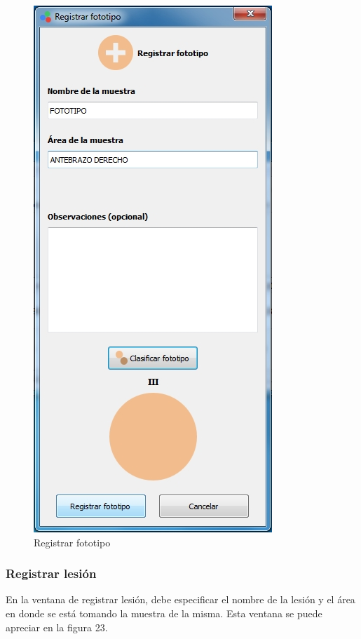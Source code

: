\begin{figure}[H]
  \centering
  \includegraphics[width=.5\linewidth]{./img/registrar-fototipo2.jpg}
\caption{Registrar fototipo}
\end{figure}
		
		\subsubsection{Registrar lesi\'{o}n}
			En la ventana de registrar lesi\'{o}n, debe especificar el nombre de la lesi\'{o}n y el \'{a}rea en donde se est\'{a} tomando la muestra de la misma. Esta ventana se puede apreciar en la figura 23.		
		
